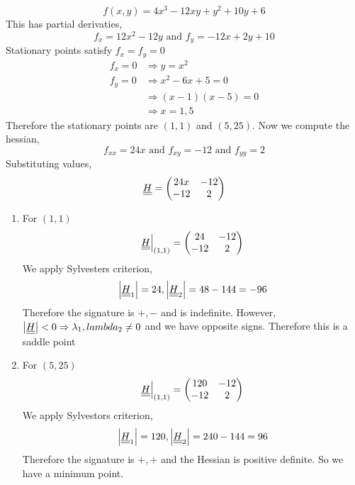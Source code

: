 \documentclass{article}
\begin{document}
\begin{eg}
    \[
        f(x, y) = 4x^3 - 12 xy + y^2 + 10y + 6  
    \]
    This has partial derivaties,
    \[
        f_x = 12x^2 - 12 y \text{ and } f_y = - 12x + 2y + 10  
    \]
    Stationary points satisfy $f_x = f_y = 0$
    \begin{align*}
        f_x = 0 &\Rightarrow y = x^2 \\
        f_y = 0 &\Rightarrow x^2 - 6x + 5 = 0 \\
        &\Rightarrow (x - 1)(x - 5) = 0 \\
        &\Rightarrow x = 1, 5
    \end{align*}
    Therefore the stationary points are $(1, 1)$ and $(5, 25)$.
    Now we compute the hessian,
    \[
        f_{xx} = 24x \text{ and } f_{xy} = -12 \text{ and } f_{yy} = 2  
    \]
    Substituting values,
    \[
        \underline{\underline{H}} = \begin{pmatrix}
            24x & -12 \\
            -12 & 2
        \end{pmatrix}
    \]
    \begin{enumerate}[cases]
        \item For $(1,1)$
        \[
            \underline{\underline{H}} \Big{|}_{(1,1)}{} = \begin{pmatrix}
                24 & -12 \\
                -12 & 2
            \end{pmatrix}
        \]
        We apply Sylvesters criterion, 
        \[
            \left\lvert \underline{\underline{H}}_1\right\rvert = 24, \left\lvert \underline{\underline{H}}_2\right\rvert = 48 - 144 = - 96
        \]
        Therefore the signature is $+, -$ and is indefinite.
        However, $\left\lvert \underline{\underline{H}}\right\rvert < 0 \Rightarrow \lambda_1, lambda_2 \neq 0$ and we have opposite signs. 
        Therefore this is a saddle point

        \item For $(5, 25)$
        \[
            \underline{\underline{H}} \Big{|}_{(1,1)}{} = \begin{pmatrix}
                120 & -12 \\
                -12 & 2
            \end{pmatrix}
        \]
        We apply Sylvestors criterion,
        \[
            \left\lvert \underline{\underline{H}}_1\right\rvert = 120, \left\lvert \underline{\underline{H}}_2\right\rvert = 240 - 144 = 96
        \]
        Therefore the signature is $+, +$ and the Hessian is positive definite.
        So we have a minimum point.
    \end{enumerate}


\end{eg}
\end{document}
